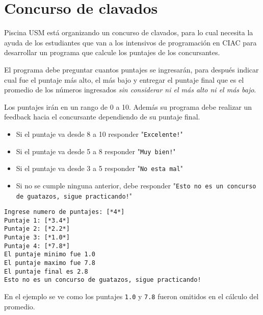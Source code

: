 \section{Concurso de clavados}
Piscina USM está organizando un concurso de clavados, para lo cual necesita la ayuda de los estudiantes que van a los intensivos de programación en CIAC para desarrollar un programa que calcule los puntajes de los concursantes.

El programa debe preguntar cuantos puntajes se ingresarán, para después indicar cual fue el puntaje más alto, el más bajo y entregar el puntaje final que es el promedio de los números ingresados \textit{sin considerar ni el más alto ni el más bajo}.

Los puntajes irán en un rango de 0 a 10. Además su programa debe realizar un feedback hacia el concursante dependiendo de su puntaje final.
\begin{itemize}
    \item Si el puntaje va desde 8 a 10 responder "\texttt{Excelente!}"
    \item Si el puntaje va desde 5 a 8 responder "\texttt{Muy bien!}"
    \item Si el puntaje va desde 3 a 5 responder "\texttt{No esta mal}"
    \item Si no se cumple ninguna anterior, debe responder "\texttt{Esto no es un concurso de guatazos, sigue practicando!}"
\end{itemize}



\begin{lstlisting}[style=consola]
Ingrese numero de puntajes: [*4*]
Puntaje 1: [*3.4*]
Puntaje 2: [*2.2*]
Puntaje 3: [*1.0*]
Puntaje 4: [*7.8*]
El puntaje minimo fue 1.0
El puntaje maximo fue 7.8
El puntaje final es 2.8
Esto no es un concurso de guatazos, sigue practicando!
\end{lstlisting}

En el ejemplo se ve como los puntajes \texttt{1.0} y \texttt{7.8} fueron omitidos en el cálculo del promedio.